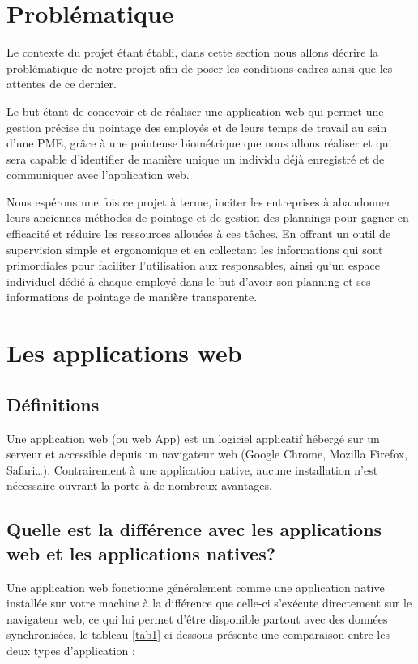 \section{Problématique}
Le contexte du projet étant établi, dans cette section nous allons décrire la
problématique de notre projet afin de poser les conditions-cadres ainsi que les
attentes de ce dernier.

Le but étant de concevoir et de réaliser une application web qui permet une
gestion précise du pointage des employés et de leurs temps de travail au sein
d’une PME, grâce à une pointeuse biométrique que nous allons réaliser et qui sera
capable d’identifier de manière unique un individu déjà enregistré et de
communiquer avec l’application web.

Nous espérons une fois ce projet à terme, inciter les entreprises à abandonner
leurs anciennes méthodes de pointage et de gestion des plannings pour gagner en
efficacité et réduire les ressources allouées à ces tâches. En offrant un outil
de supervision simple et ergonomique et en collectant les informations qui sont
primordiales pour faciliter l’utilisation aux responsables, ainsi qu’un espace
individuel dédié à chaque employé dans le but d’avoir son planning et ses
informations de pointage de manière transparente.


\section{Les applications web}

\subsection{Définitions}
Une application web (ou web App) est un logiciel applicatif hébergé sur un
serveur et accessible depuis un navigateur web (Google Chrome, Mozilla Firefox,
Safari…). Contrairement à une application native, aucune installation n’est
nécessaire ouvrant la porte à de nombreux avantages.
        
\subsection{Quelle est la différence avec les applications web et les applications natives?}
Une application web fonctionne généralement comme une application native
installée sur votre machine à la différence que celle-ci s’exécute directement
sur le navigateur web, ce qui lui permet d’être disponible partout avec des
données synchronisées, le tableau \ref{tab1}  ci-dessous présente une
comparaison entre les deux types d’application \cite{1} :
        
